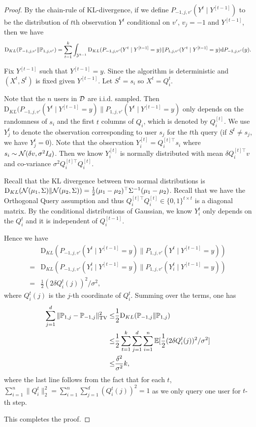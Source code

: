 \begin{proof}
By the chain-rule of KL-divergence, if we define $P_{-1,j,v'}(Y^t\mid Y^{[t-1]})$ to be the distribution of $t$th observation $Y^t$ conditional on $v'$, $v_j=-1$ and $Y^{[t-1]}$, then we have
\begin{align*}
    \mathrm{D}_{KL}(\mathbb P_{-1,j,v'}\|\mathbb P_{1,j,v'})=\sum_{t=1}^{k}\int_{\mathcal Y^{t-1}} \mathrm{D}_{KL}(P_{-1,j,v'}(Y^t\mid Y^{[t-1]}=y)\|P_{1,j,v'}(Y^t\mid Y^{[t-1]}=y)\mathrm{d} P_{-1,j,v'}(y).
\end{align*}

Fix $Y^{[t-1]}$ such that $Y^{[t-1]}=y$.
Since the algorithm is deterministic and $(X^t,S^t)$ is fixed given $Y^{[t-1]}$.
Let $S^t=s_i$ so $X^t=Q_i^t$.

Note that the $n$ users in $\mathcal D$ are i.i.d. sampled.
Then $\mathrm{D}_{KL}(P_{-1,j,v'}(Y^t\mid Y^{[t-1]}=y)\|P_{1,j,v'}(Y^t\mid Y^{[t-1]}=y)$ only depends on the randomness of $s_i$ and the first $t$ columns of $Q_{i}$, which is denoted by $Q_{i}^{[t]}$.
We use $Y^{t}_{j}$ to denote the observation corresponding to user $s_j$ for the $t$th query (if $S^t\neq s_j$, we have $Y^{t}_j=0$).
Note that the observation $Y^{[t]}_i=Q_i^{[t]\top} s_i$ where $s_i\sim \mathcal N(\delta v,\sigma^2 I_d)$. Then we know $Y^{[t]}_i$ is normally distributed with mean $\delta Q_{i}^{[t]\top} v$ and co-variance $\sigma^2 Q_{i}^{[t]\top} Q_{i}^{[t]}$.

Recall that the KL divergence between two normal distributions is $\mathrm{D}_{KL}(\mathcal N(\mu_1,\Sigma)\|\mathcal N(\mu_2,\Sigma))=\frac{1}{2}(\mu_1-\mu_2)^{\top}\Sigma^{-1}(\mu_1-\mu_2)$. Recall that we have the Orthogonal Query assumption and thus $Q_{i}^{[t]\top} Q_{i}^{[t]}\in\{0,1\}^{t\times t}$ is a diagonal matrix.
By the conditional distributions of Gaussian, we know $Y^t_i$ only depends on the $Q_{i}^t$ and it is independent of $Q_{i}^{[t-1]}$.

Hence we have
\begin{align*}
    &\mathrm{D}_{KL}(P_{-1,j,v'}(Y^t\mid Y^{[t-1]}=y)\|P_{1,j,v'}(Y^t\mid Y^{[t-1]}=y))\\
    =&\mathrm{D}_{KL}(P_{-1,j,v'}(Y^t_i\mid Y^{[t-1]}=y)\|P_{1,j,v'}(Y^t_i\mid Y^{[t-1]}=y))\\
    =&\frac{1}{2} (2\delta Q_{i}^t(j))^2/\sigma^2,
\end{align*}
where $Q_{i}^t(j)$ is the $j$-th coordinate of $Q_{i}^t$.
Summing over the terms, one has
\begin{align*}
\sum_{j=1}^{d}\|\mathbb P_{1,j}-\mathbb P_{-1,j}\|_{\mathrm{TV}}^2\leq &
    \frac{1}{2}\mathrm{D}_{KL}(\mathbb P_{-1,j}\|\mathbb P_{1,j})\\
    \leq&\frac{1}{2} \sum_{t=1}^{k}\sum_{j=1}^{d}\sum_{i=1}^{n}\operatorname*{\mathbb{E}}[\frac{1}{2} (2\delta Q_{i}^t(j))^2/\sigma^2] \\
    \leq& \frac{\delta^2}{\sigma^2}k,
\end{align*}
where the last line follows from the fact that for each $t$,$ \sum_{i=1}^{n}\|Q_{i}^t\|_2^2=\sum_{i=1}^{n}\sum_{j=1}^{d}(Q_{i}^t(j))^2=1$ as we only query one user for $t$-th step.

This completes the proof.
\end{proof}

